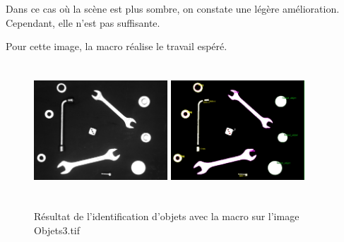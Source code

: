 \documentclass{scrreprt}
\begin{document}
Dans ce cas où la scène est plus sombre, on constate une légère amélioration.
Cependant, elle n'est pas suffisante.

\newpage
Pour cette image, la macro réalise le travail espéré.
\begin{figure}[!h]
\centering
\includegraphics[width=5cm, height=5cm]{images/objet3o.png}\hfill
\includegraphics[width=5cm, height=5cm]{images/objet3.png}
\caption{Résultat de l'identification d'objets avec la macro sur l'image Objets3.tif}
\end{figure}
\end{document}
